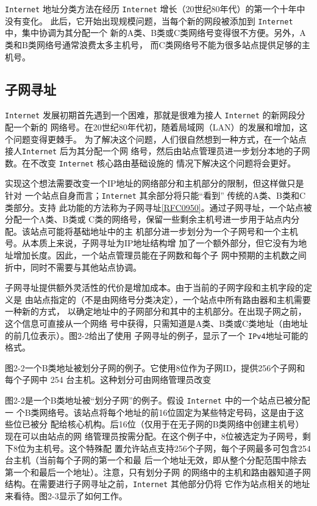 \verb|Internet| 地址分类方法在经历 \verb|Internet| 增长（20世纪80年代）的第一个十年中没有变化。
此后，它开始出现规模问题，当每个新的网段被添加到 \verb|Internet| 中，集中协调为其分配一个
新的A类、B类或C类网络号变得很不方便。另外，A类和B类网络号通常浪费太多主机号，
而C类网络号不能为很多站点提供足够的主机号。

\subsection{子网寻址}
\verb|Internet| 发展初期首先遇到一个困难，那就是很难为接人 \verb|Internet| 的新网段分配一个新的
网络号。在20世纪80年代初，随着局域网（LAN）的发展和增加，这个问题变得更棘手。
为了解决这个问题，人们很自然想到一种方式，在一个站点接人\verb|Internet| 后为其分配一个网
络号，然后由站点管理员进一步划分本地的子网数。在不改变 \verb|Internet| 核心路由基础设施的
情况下解决这个问题将会更好。

实现这个想法需要改变一个IP地址的网络部分和主机部分的限制，但这样做只是针对
一个站点自身而言；\verb|Internet| 其余部分将只能“看到” 传统的A类、B类和C类部分。支持
此功能的方法称为子网寻址\href{https://www.rfc-editor.org/rfc/rfc0950}{[RFC0950]}。通过子网寻址，一个站点被分配一个A类、B类或
C类的网络号，保留一些剩余主机号进一步用于站点内分配。该站点可能将基础地址中的主
机部分进一步划分为一个子网号和一个主机号。从本质上来说，子网寻址为IP地址结构增
加了一个额外部分，但它没有为地址增加长度。因此，一个站点管理员能在子网数和每个子
网中预期的主机数之间折中，同时不需要与其他站点协调。

子网寻址提供额外灵活性的代价是增加成本。由于当前的子网字段和主机字段的定义是
由站点指定的（不是由网络号分类决定），一个站点中所有路由器和主机需要一种新的方式，
以确定地址中的子网部分和其中的主机部分。在出现子网之前，这个信息可直接从一个网络
号中获得，只需知道是A类、B类或C类地址（由地址的前几位表示）。图2-2给出了使用
子网寻址的例子，显示了一个 \verb|IPv4|地址可能的格式。

图2-2一个B类地址被划分子网的例子。它使用8位作为子网ID，提供256个子网和每个子网中
254 台主机。这种划分可由网络管理员改变

图2-2是一个B类地址被“划分子网”的例子。假设 \verb|Internet| 中的一个站点已被分配一
个B类网络号。该站点将每个地址的前16位固定为某些特定号码，这是由于这些位已被分
配给核心机构。后16位（仅用于在无子网的B类网络中创建主机号）现在可以由站点的网
络管理员按需分配。在这个例子中，8位被选定为子网号，剩下8位为主机号。这个特殊配
置允许站点支持256个子网，每个子网最多可包含254台主机（当前每个子网的第一个和最
后一个地址无效，即从整个分配范围中除去第一个和最后一个地址）。注意，只有划分子网
的网络中的主机和路由器知道子网结构。在需要进行子网寻址之前，\verb|Internet| 其他部分仍将
它作为站点相关的地址来看待。图2-3显示了如何工作。

